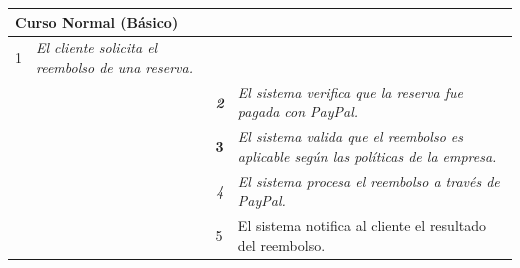     \begin{table}[H]
        \begin{tabular}{llllllll}
        \hline
        \multicolumn{8}{|l|}{\cellcolor[HTML]{F2F2F2}Curso Normal (Básico)}                                                                                                                                                                                                                                                                          \\ \hline
        \multicolumn{1}{|c|}{1}  & \multicolumn{1}{l|}{{\color[HTML]{808080} \textit{El cliente solicita el reembolso de una reserva.}}} & \multicolumn{1}{l|}{{\color[HTML]{808080} }}                    & \multicolumn{5}{l|}{{\color[HTML]{808080} }}                                                                                            \\ \hline
        \multicolumn{1}{|c|}{}   & \multicolumn{1}{l|}{{\color[HTML]{808080} \textit{}}}                                                 & \multicolumn{1}{c|}{{\color[HTML]{808080} \textit{\textbf{2}}}} & \multicolumn{5}{p{6cm}|}{{\color[HTML]{808080} \textit{El sistema verifica que la reserva fue pagada con PayPal.}}}                         \\ \hline
        \multicolumn{1}{|l|}{}   & \multicolumn{1}{l|}{{\color[HTML]{808080} }}                                                          & \multicolumn{1}{l|}{{\color[HTML]{808080} \textbf{3}}}          & \multicolumn{5}{p{6cm}|}{{\color[HTML]{808080} \textit{El sistema valida que el reembolso es aplicable según las políticas de la empresa.}}} \\ \hline
        \multicolumn{1}{|l|}{}   & \multicolumn{1}{l|}{{\color[HTML]{808080} }}                                                          & \multicolumn{1}{c|}{{\color[HTML]{808080} \textit{4}}}          & \multicolumn{5}{p{6cm}|}{{\color[HTML]{808080} \textit{El sistema procesa el reembolso a través de PayPal.}}}                   \\ \hline
        \multicolumn{1}{|l|}{}   & \multicolumn{1}{l|}{{\color[HTML]{808080} }}                                                          & \multicolumn{1}{l|}{{\color[HTML]{808080} 5}}                   & \multicolumn{5}{p{6cm}|}{{\color[HTML]{808080} El sistema notifica al cliente el resultado del reembolso.}}                                  \\ \hline
        \end{tabular}
        \end{table}

